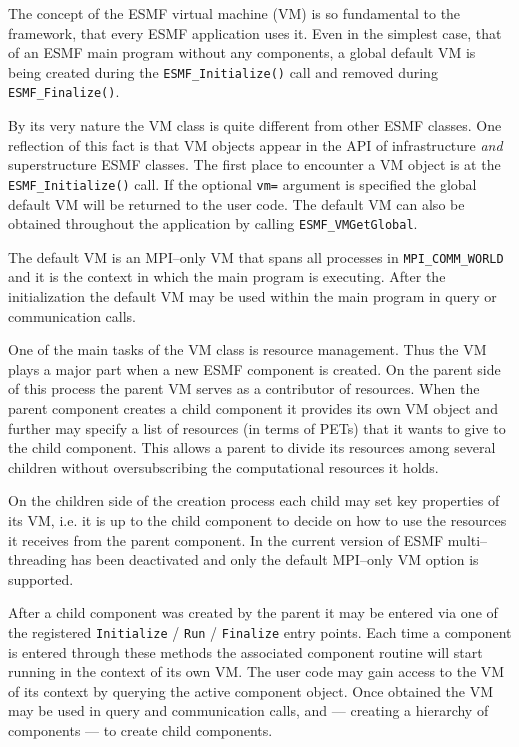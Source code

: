 
The concept of the ESMF virtual machine (VM) is so fundamental to the framework, that every ESMF application uses it. Even in the simplest case, that of an ESMF main program without any components, a global default VM is being created during the {\tt ESMF\_Initialize()} call and removed during {\tt ESMF\_Finalize()}.

By its very nature the VM class is quite different from other ESMF classes. One reflection of this fact is that VM objects appear in the API of infrastructure {\it and} superstructure ESMF classes. The first place to encounter a VM object is at the {\tt ESMF\_Initialize()} call. If the optional {\tt vm=} argument is specified the global default VM will be returned to the user code. The default VM can also be obtained throughout the application by calling {\tt ESMF\_VMGetGlobal}.

The default VM is an MPI--only VM that spans all processes in {\tt MPI\_COMM\_WORLD} and it is the context in which the main program is executing. After the initialization the default VM may be used within the main program in query or communication calls. 

One of the main tasks of the VM class is resource management. Thus the VM plays a major part when a new ESMF component is created. On the parent side of this process the parent VM serves as a contributor of resources. When the parent component creates a child component it provides its own VM object and further may specify a list of resources (in terms of PETs) that it wants to give to the child component. This allows a parent to divide its resources among several children without oversubscribing the computational resources it holds.

On the children side of the creation process each child may set key properties of its VM, i.e. it is up to the child component to decide on how to use the resources it receives from the parent component. In the current version of ESMF multi--threading has been deactivated and only the default MPI--only VM option is supported.


After a child component was created by the parent it may be entered via one of the registered {\tt Initialize} / {\tt Run} / {\tt Finalize} entry points. Each time a component is entered through these methods the associated component routine will start running in the context of its own VM. The user code may gain access to the VM of its context by querying the active component object. Once obtained the VM may be used in query and communication calls, and --- creating a hierarchy of components --- to create child components.
